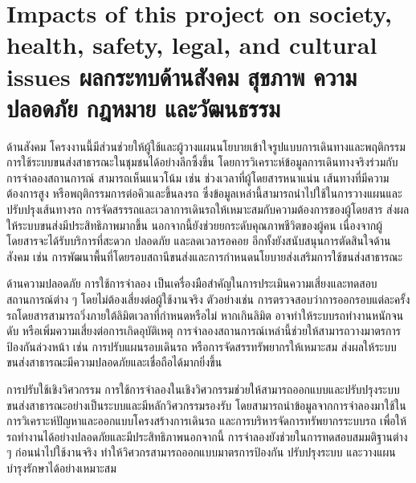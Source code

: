 \section{\ifenglish%
Impacts of this project on society, health, safety, legal, and cultural issues
\else%
ผลกระทบด้านสังคม สุขภาพ ความปลอดภัย กฎหมาย และวัฒนธรรม
\fi}
\begin{mypara}
    \indent ด้านสังคม โครงงานนี้มีส่วนช่วยให้ผู้ใช้และผู้วางแผนนโยบายเข้าใจรูปแบบการเดินทางและพฤติกรรมการใช้ระบบขนส่งสาธารณะในชุมชนได้อย่างลึกซึ้งขึ้น โดยการวิเคราะห์ข้อมูลการเดินทางจริงร่วมกับการจำลองสถานการณ์ สามารถเห็นแนวโน้ม 
    เช่น ช่วงเวลาที่ผู้โดยสารหนาแน่น เส้นทางที่มีความต้องการสูง หรือพฤติกรรมการต่อคิวและขึ้นลงรถ ซึ่งข้อมูลเหล่านี้สามารถนำไปใช้ในการวางแผนและปรับปรุงเส้นทางรถ การจัดสรรรถและเวลาการเดินรถให้เหมาะสมกับความต้องการของผู้โดยสาร 
    ส่งผลให้ระบบขนส่งมีประสิทธิภาพมากขึ้น นอกจากนี้ยังช่วยยกระดับคุณภาพชีวิตของผู้คน เนื่องจากผู้โดยสารจะได้รับบริการที่สะดวก ปลอดภัย และลดเวลารอคอย อีกทั้งยังสนับสนุนการตัดสินใจด้านสังคม เช่น 
    การพัฒนาพื้นที่โดยรอบสถานีขนส่งและการกำหนดนโยบายส่งเสริมการใช้ขนส่งสาธารณะ

    \indent ด้านความปลอดภัย การใช้การจำลอง เป็นเครื่องมือสำคัญในการประเมินความเสี่ยงและทดสอบสถานการณ์ต่าง ๆ โดยไม่ต้องเสี่ยงต่อผู้ใช้งานจริง ตัวอย่างเช่น การตรวจสอบว่าการออกรอบแต่ละครั้ง 
    รถโดยสารสามารถวิ่งภายใต้ลิมิตเวลาที่กำหนดหรือไม่ หากเกินลิมิต อาจทำให้ระบบรถทำงานหนักจนดับ หรือเพิ่มความเสี่ยงต่อการเกิดอุบัติเหตุ การจำลองสถานการณ์เหล่านี้ช่วยให้สามารถวางมาตรการป้องกันล่วงหน้า 
    เช่น การปรับแผนรอบเดินรถ หรือการจัดสรรทรัพยากรให้เหมาะสม ส่งผลให้ระบบขนส่งสาธารณะมีความปลอดภัยและเชื่อถือได้มากยิ่งขึ้น

    \indent การปรับใช้เชิงวิศวกรรม การใช้การจำลองในเชิงวิศวกรรมช่วยให้สามารถออกแบบและปรับปรุงระบบขนส่งสาธารณะอย่างเป็นระบบและมีหลักวิศวกรรมรองรับ โดยสามารถนำข้อมูลจากการจำลองมาใช้ในการวิเคราะห์ปัญหาและออกแบบโครงสร้างการเดินรถ 
    และการบริหารจัดการทรัพยากรระบบรถ เพื่อให้รถทำงานได้อย่างปลอดภัยและมีประสิทธิภาพนอกจากนี้ การจำลองยังช่วยในการทดสอบสมมติฐานต่าง ๆ ก่อนนำไปใช้งานจริง ทำให้วิศวกรสามารถออกแบบมาตรการป้องกัน ปรับปรุงระบบ และวางแผนบำรุงรักษาได้อย่างเหมาะสม
\end{mypara}

